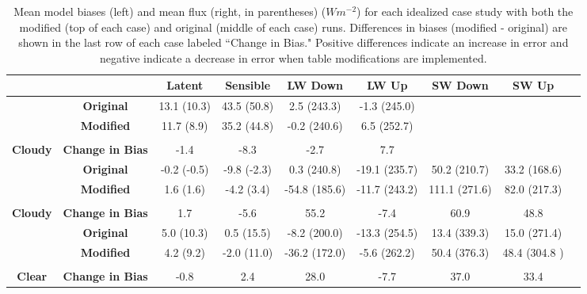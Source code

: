 \begin{table}[b!]
\centering
\scriptsize
\hspace*{-0.5cm}
\doublespacing
{
\begin{tabular}{| c | c | c | c | c | c | c | c | c |}
\hline
\rowcolor[HTML]{F3F3F3} & & \textbf{Latent} & \textbf{Sensible} & \textbf{LW Down} & \textbf{LW Up} & \textbf{SW Down} & \textbf{SW Up} \\
\hline 
\cellcolor[HTML]{F3F3F3}& \cellcolor[HTML]{F3F3F3} \textbf{Original} & 13.1 (10.3) & 43.5 (50.8) & 2.5 (243.3) & -1.3 (245.0) &  & \\
\cellcolor[HTML]{F3F3F3} & \cellcolor[HTML]{F3F3F3} \textbf{Modified} & 11.7 (8.9) & 35.2 (44.8) & -0.2 (240.6) & 6.5 (252.7) & & \\
\cellcolor[HTML]{F3F3F3}\multirow{-3}{*}{\shortstack{\textbf{Winter} \\ \textbf{Cloudy}}} & \cellcolor[HTML]{F3F3F3} \textbf{Change in Bias} & -1.4 & -8.3  & -2.7  & 7.7  & & \\
\hline
\cellcolor[HTML]{F3F3F3} & \cellcolor[HTML]{F3F3F3} \textbf{Original} & -0.2 (-0.5) & -9.8 (-2.3) & 0.3 (240.8) & -19.1 (235.7) & 50.2 (210.7) & 33.2 (168.6) \\
\cellcolor[HTML]{F3F3F3} & \cellcolor[HTML]{F3F3F3} \textbf{Modified} & 1.6 (1.6) & -4.2 (3.4) & -54.8 (185.6) & -11.7 (243.2) & 111.1 (271.6) & 82.0 (217.3) \\
\cellcolor[HTML]{F3F3F3} \multirow{-3}{*}{\shortstack{\textbf{Spring} \\ \textbf{Cloudy}}} & \cellcolor[HTML]{F3F3F3} \textbf{Change in Bias} & 1.7 & -5.6 & 55.2 & -7.4 & 60.9 & 48.8 \\
\hline
\cellcolor[HTML]{F3F3F3} & \cellcolor[HTML]{F3F3F3} \textbf{Original} & 5.0 (10.3) & 0.5 (15.5) & -8.2 (200.0) & -13.3 (254.5) & 13.4 (339.3) & 15.0 (271.4) \\
\cellcolor[HTML]{F3F3F3} & \cellcolor[HTML]{F3F3F3} \textbf{Modified} & 4.2 (9.2) & -2.0 (11.0) & -36.2 (172.0) & -5.6 (262.2) & 50.4 (376.3) & 48.4 (304.8 ) \\
\cellcolor[HTML]{F3F3F3} \multirow{-3}{*}{\shortstack{\textbf{Spring} \\ \textbf{Clear}}} & \cellcolor[HTML]{F3F3F3} \textbf{Change in Bias} \cellcolor[HTML]{F3F3F3} & -0.8 & 2.4 & 28.0 & -7.7  & 37.0 & 33.4 \\
\hline
\end{tabular}}
\caption[Mean model bias comparison for idealized WRF runs with modified LANDUSE.TBL values.]{Mean model biases (left) and mean flux (right, in parentheses) ($Wm^{-2}$) for each idealized case study with both the modified (top of each case) and original (middle of each case) runs. Differences in biases (modified - original) are shown in the last row of each case labeled ``Change in Bias." Positive differences indicate an increase in error and negative indicate a decrease in error when table modifications are implemented.}
\label{tab:wrf:meanbias}
\end{table}

